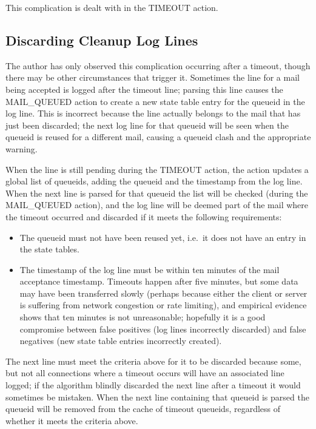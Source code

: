 This complication is dealt with in the TIMEOUT action.

\subsection{Discarding Cleanup Log Lines}

\label{discarding cleanup log lines}

The author has only observed this complication occurring after a timeout,
though there may be other circumstances that trigger it.  Sometimes the
 line for a mail being accepted is logged after the timeout
line; parsing this line causes the MAIL\_QUEUED action to create a new
state table entry for the queueid in the log line.  This is incorrect
because the line actually belongs to the mail that has just been discarded;
the next log line for that queueid will be seen when the queueid is reused
for a different mail, causing a queueid clash and the appropriate warning.

When the  line is still pending during the TIMEOUT action,
the action updates a global list of queueids, adding the queueid and the
timestamp from the log line.  When the next  line is parsed
for that queueid the list will be checked (during the MAIL\_QUEUED action),
and the log line will be deemed part of the mail where the timeout occurred
and discarded if it meets the following requirements:

\begin{itemize}

    \item The queueid must not have been reused yet, i.e.\ it does not have
        an entry in the state tables.

    \item The timestamp of the  log line must be within ten
        minutes of the mail acceptance timestamp.  Timeouts happen after
        five minutes, but some data may have been transferred slowly
        (perhaps because either the client or server is suffering from
        network congestion or rate limiting), and empirical evidence shows
        that ten minutes is not unreasonable; hopefully it is a good
        compromise between false positives (log lines incorrectly
        discarded) and false negatives (new state table entries incorrectly
        created).

\end{itemize}

The next  line must meet the criteria above for it to be
discarded because some, but not all connections where a timeout occurs will
have an associated  line logged; if the algorithm blindly
discarded the next  line after a timeout it would sometimes
be mistaken.  When the next  line containing that queueid is
parsed the queueid will be removed from the cache of timeout queueids,
regardless of whether it meets the criteria above.

